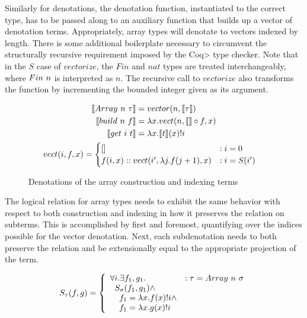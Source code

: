   Similarly for denotations, the denotation function, instantiated to the correct type, has to be passed along to an auxiliary function that builds up a vector of denotation terms.
  Appropriately, array types will denotate to vectors indexed by length.
  There is some additional boilerplate necessary to circumvent the structurally recursive requirement imposed by the \<Coq> type checker.
  Note that in the $S$ case of $vectorize$, the $Fin$ and $nat$ types are treated interchangeably, where $Fin\ n$ is interpreted as $n$.
  The recursive call to $vectorize$ also transforms the function by incrementing the bounded integer given as its argument.

  \begin{figure}
    \centering
    \begin{gather}
      \begin{align*}
      \llbracket Array\ n\ \tau \rrbracket &=
        vector(n, \llbracket \tau \rrbracket) \\
      \llbracket build\ n\ f \rrbracket &=
        \lambda x.
        vect(n, \llbracket \rrbracket \circ f, x) \\
      \llbracket get\ i\ t \rrbracket &=
        \lambda x. \llbracket t \rrbracket(x) ! i \\
      \end{align*} \\
      \begin{align*}
      vect(i, f, x) &=
        \begin{cases}
          []
            &: i = 0 \\
          f(i, x) :: vect(i', \lambda j. f(j + 1), x)
            &: i = S(i')
        \end{cases}
      \end{align*}
    \end{gather}
    \caption{Denotations of the array construction and indexing terms}
    \label{eqn:denotation_array}
  \end{figure}

  The logical relation for array types needs to exhibit the same behavior with respect to both construction and indexing in how it preserves the relation on subterms.
  This is accomplished by first and foremost, quantifying over the indices possible for the vector denotation.
  Next, each subdenotation needs to both preserve the relation and be extensionally equal to the appropriate projection of the term.

  \begin{equation}
    S_\tau(f, g) =
      \left\{
        \begin{array}{ll}
          \forall i. \exists f_1, g_1.
            & : \tau = Array\ n\ \sigma \\
          \;\;S_\sigma(f_1, g_1) \wedge \\
          \;\;\;\;f_1 = \lambda x. f(x)!i \wedge \\
          \;\;\;\;f_1 = \lambda x. g(x)!i \\
        \end{array}
      \right.
  \label{eqn:lr_array}
  \end{equation}

